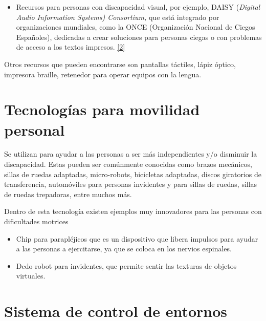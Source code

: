 \documentclass[12pt,spanish,Letterpaper,openany]{book}
\providecommand{\tightlist}{%
  \setlength{\itemsep}{0pt}\setlength{\parskip}{0pt}}
\newcommand{\spaceminusmilis}{\vspace{-0.5mm}}
\begin{document}
\hypertarget{articulo05_cross02}{}

\begin{itemize}
\tightlist
\item
  Recursos para personas con discapacidad visual, por ejemplo, DAISY (\emph{Digital Audio Information Systems) Consortium,} que está integrado por organizaciones mundiales, como la ONCE (Organización Nacional de Ciegos Españoles), dedicadas a crear soluciones para personas ciegas o con problemas de acceso a los textos impresos. \protect\hyperlink{articulo05_ref02}{{[}2{]}}
\end{itemize}

Otros recursos que pueden encontrarse son pantallas táctiles, lápiz óptico, impresora braille, retenedor para operar equipos con la lengua.

\hypertarget{tecnologuxedas-para-movilidad-personal}{%
\section{Tecnologías para movilidad personal}\label{tecnologuxedas-para-movilidad-personal}}

\spaceminusmilis

Se utilizan para ayudar a las personas a ser más independientes y/o disminuir la discapacidad. Estas pueden ser comúnmente conocidas como brazos mecánicos, sillas de ruedas adaptadas, micro-robots, bicicletas adaptadas, discos giratorios de transferencia, automóviles para personas invidentes y para sillas de ruedas, sillas de ruedas trepadoras, entre muchos más.

Dentro de esta tecnología existen ejemplos muy innovadores para las personas con dificultades motrices

\begin{itemize}
\item
  Chip para parapléjicos que es un dispositivo que libera impulsos para ayudar a las personas a ejercitarse, ya que se coloca en los nervios espinales.
\item
  Dedo robot para invidentes, que permite sentir las texturas de objetos virtuales.
\end{itemize}

\hypertarget{sistema-de-control-de-entornos}{%
\section{Sistema de control de entornos}\label{sistema-de-control-de-entornos}}
\end{document}
